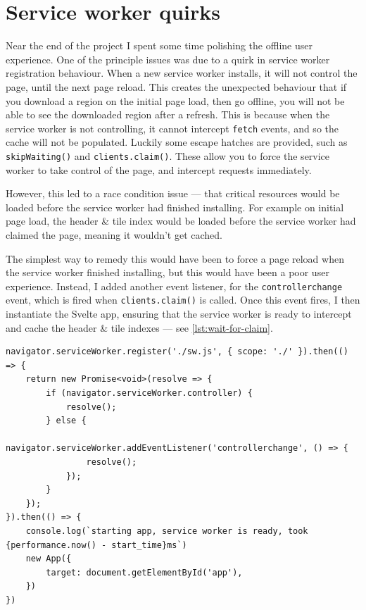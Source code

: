 \documentclass[hyphens]{final_report}
\begin{document}
\section{Service worker quirks}

Near the end of the project I spent some time polishing the offline user experience. One of the principle issues was due to a quirk in service worker registration behaviour. When a new service worker installs, it will not control the page, until the next page reload. This creates the unexpected behaviour that if you download a region on the initial page load, then go offline, you will not be able to see the downloaded region after a refresh. This is because when the service worker is not controlling, it cannot intercept \texttt{fetch} events, and so the cache will not be populated. Luckily some escape hatches are provided, such as \texttt{skipWaiting()} and \texttt{clients.claim()}. These allow you to force the service worker to take control of the page, and intercept requests immediately.

However, this led to a race condition issue --- that critical resources would be loaded before the service worker had finished installing. For example on initial page load, the header \& tile index would be loaded before the service worker had claimed the page, meaning it wouldn't get cached.

The simplest way to remedy this would have been to force a page reload when the service worker finished installing, but this would have been a poor user experience. Instead, I added another event listener, for the \texttt{controllerchange} event, which is fired when \texttt{clients.claim()} is called. Once this event fires, I then instantiate the Svelte app, ensuring that the service worker is ready to intercept and cache the header \& tile indexes --- see \autoref{lst:wait-for-claim}.

\begin{lstlisting}[caption=Waiting for the service worker to claim the page before starting the app, numbers=none, label=lst:wait-for-claim]
navigator.serviceWorker.register('./sw.js', { scope: './' }).then(() => {
    return new Promise<void>(resolve => {
        if (navigator.serviceWorker.controller) {
            resolve();
        } else {
            navigator.serviceWorker.addEventListener('controllerchange', () => {
                resolve();
            });
        }
    });
}).then(() => {
    console.log(`starting app, service worker is ready, took {performance.now() - start_time}ms`)
    new App({
        target: document.getElementById('app'),
    })
})
\end{lstlisting}
\end{document}
